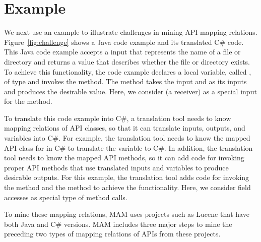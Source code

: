 \section{Example}
\label{sec:example}

We next use an example to illustrate challenges in mining
API mapping relations. Figure~\ref{fig:challenge} shows a
Java code example and its translated C\# code. This Java code
example accepts a  input that represents the name of a
file or directory and returns a  value that
describes whether the file or directory exists. To achieve this functionality, the
code example declares a local variable, called , of
type  and invokes the  method. The
method takes the  input and  as its
inputs and produces the desirable  value. Here, we
consider  (a receiver) as a special input for
the  method.

To translate this code example into C\#, a translation tool needs to
know mapping relations of API classes, so that it can translate inputs,
outputs, and variables into C\#. For example, the translation tool
needs to know the mapped API class for  in C\#
to translate the variable  to C\#. In addition, the
translation tool needs to know the mapped API methods, so it can
add code for invoking proper API methods that use translated inputs and variables to
produce desirable outputs. For this example, the translation tool
adds code for invoking the  method and the
 method to achieve the functionality.
Here, we consider field accesses as special type of method calls.

To mine these mapping relations, MAM uses projects such as Lucene
that have both Java and C\# versions. MAM includes three major steps
to mine the preceding two types of mapping relations of APIs from these projects.

